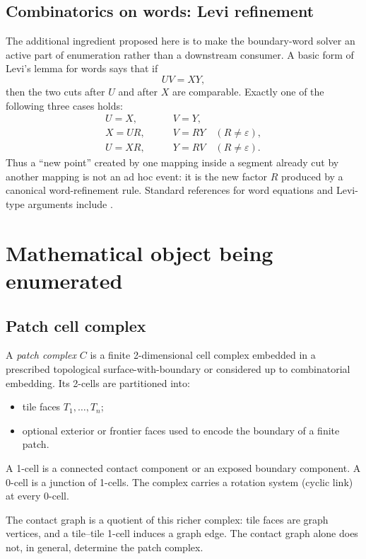 \documentclass[11pt]{article}
\begin{document}
\subsection{Combinatorics on words: Levi refinement}

The additional ingredient proposed here is to make the boundary-word solver an active part of enumeration rather than a downstream consumer.  A basic form of Levi's lemma for words says that if
\[
  UV=XY,
\]
then the two cuts after $U$ and after $X$ are comparable.  Exactly one of the following three cases holds:
\begin{align*}
  U=X,&\qquad V=Y,\\
  X=UR,&\qquad V=RY\quad(R\neq\varepsilon),\\
  U=XR,&\qquad Y=RV\quad(R\neq\varepsilon).
\end{align*}
Thus a ``new point'' created by one mapping inside a segment already cut by another mapping is not an ad hoc event: it is the new factor $R$ produced by a canonical word-refinement rule.  Standard references for word equations and Levi-type arguments include \cite{Lothaire1983}.

\section{Mathematical object being enumerated}

\subsection{Patch cell complex}

A \emph{patch complex} $C$ is a finite 2-dimensional cell complex embedded in a prescribed topological surface-with-boundary or considered up to combinatorial embedding.  Its 2-cells are partitioned into:
\begin{itemize}
  \item tile faces $T_1,\ldots,T_n$;
  \item optional exterior or frontier faces used to encode the boundary of a finite patch.
\end{itemize}
A 1-cell is a connected contact component or an exposed boundary component.  A 0-cell is a junction of 1-cells.  The complex carries a rotation system (cyclic link) at every 0-cell.

The contact graph is a quotient of this richer complex: tile faces are graph vertices, and a tile--tile 1-cell induces a graph edge.  The contact graph alone does not, in general, determine the patch complex.
\end{document}
